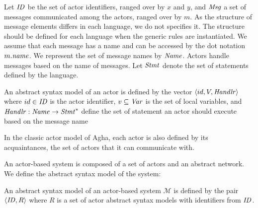 Let $\mathit{ID}$ be the set of actor identifiers, ranged over by $x$ and $y$, and $\mathit{Msg}$ a set of messages communicated among the actors, ranged over by $m$. As the structure of message elements differs in each language, we do not specifies it. The structure should be defined for each language when the generic rules are instantiated. We assume that each message has a name and can be accessed by the dot notation $m.\mathit{name}$. We represent the set of message names by $\mathit{Name}$. Actors handle messages based on the name of messages. Let $\mathit{Stmt}$ denote the set of statements defined by the language.%

\begin{defn}\label{Def::absActor}
An abstract syntax model of an actor is defined by the vector $\langle id, V,\mathit{Handlr}\rangle $ where $id\in \mathit{ID}$ is the actor identifier, $v\subseteq \mathit{Var}$ is the set of local variables, and $\mathit{Handlr} : \mathit{Name} \rightarrow \mathit{Stmt}^*$ define the set of statement an actor should execute based on the message name%
\end{defn}
In the classic actor model of Agha, each actor is also defined by its acquaintances, the set of actors that it can communicate with.  

An actor-based system is composed of a set of actors and an abstract network. We define the abstract syntax model of the system: 

\begin{defn}\label{Def::absSystem}
An abstract syntax model of an actor-based system $\mathcal{M}$ is defined by the pair $\langle \mathit{ID}, R\rangle $ where $R$ is a set of actor abstract syntax models with identifiers from $\mathit{ID}$. %
\end{defn}

